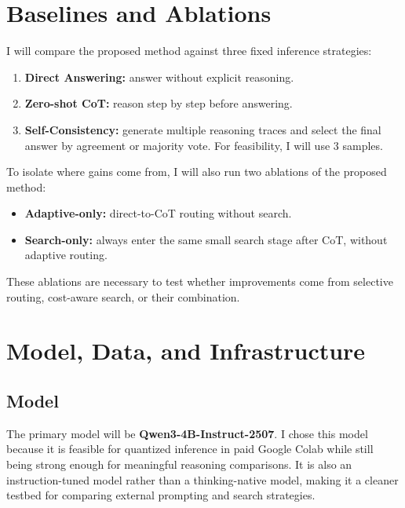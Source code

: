 \documentclass[10pt]{article}
\begin{document}
\section{Baselines and Ablations}
I will compare the proposed method against three fixed inference strategies:
\begin{enumerate}[leftmargin=1.3em,itemsep=0.10em]
    \item \textbf{Direct Answering:} answer without explicit reasoning.
    \item \textbf{Zero-shot CoT:} reason step by step before answering.
    \item \textbf{Self-Consistency:} generate multiple reasoning traces and select the final answer by agreement or majority vote. For feasibility, I will use $3$ samples.
\end{enumerate}

To isolate where gains come from, I will also run two ablations of the proposed method:
\begin{itemize}[leftmargin=1.2em,itemsep=0.08em]
    \item \textbf{Adaptive-only:} direct-to-CoT routing without search.
    \item \textbf{Search-only:} always enter the same small search stage after CoT, without adaptive routing.
\end{itemize}
These ablations are necessary to test whether improvements come from selective routing, cost-aware search, or their combination.

\section{Model, Data, and Infrastructure}
\subsection{Model}
The primary model will be \textbf{Qwen3-4B-Instruct-2507}. I chose this model because it is feasible for quantized inference in paid Google Colab while still being strong enough for meaningful reasoning comparisons. It is also an instruction-tuned model rather than a thinking-native model, making it a cleaner testbed for comparing external prompting and search strategies.
\end{document}

